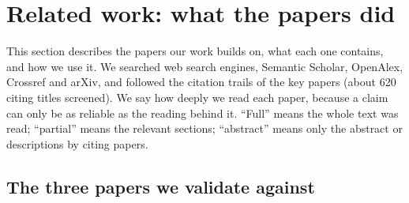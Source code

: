 \section{Related work: what the papers did}\label{sec:literature}
This section describes the papers our work builds on, what each one contains, and how we use it. We searched web search engines, Semantic Scholar, OpenAlex, Crossref and arXiv, and followed the citation trails of the key papers (about 620 citing titles screened). We say how deeply we read each paper, because a claim can only be as reliable as the reading behind it. ``Full'' means the whole text was read; ``partial'' means the relevant sections; ``abstract'' means only the abstract or descriptions by citing papers.

\subsection{The three papers we validate against}

